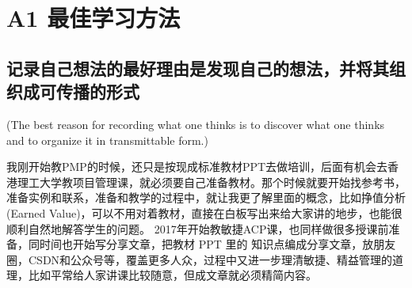 \chapter{A1 最佳学习方法} %

\hypertarget{ux8bb0ux5f55ux81eaux5df1ux60f3ux6cd5ux7684ux6700ux597dux7406ux7531ux662fux53d1ux73b0ux81eaux5df1ux7684ux60f3ux6cd5ux5e76ux5c06ux5176ux7ec4ux7ec7ux6210ux53efux4f20ux64adux7684ux5f62ux5f0f}{%
\section{记录自己想法的最好理由是发现自己的想法，并将其组织成可传播的形式}\label{ux8bb0ux5f55ux81eaux5df1ux60f3ux6cd5ux7684ux6700ux597dux7406ux7531ux662fux53d1ux73b0ux81eaux5df1ux7684ux60f3ux6cd5ux5e76ux5c06ux5176ux7ec4ux7ec7ux6210ux53efux4f20ux64adux7684ux5f62ux5f0f}}

(The best reason for recording what one thinks is to discover what one
thinks and to organize it in transmittable form.)



\newpage

我刚开始教PMP的时候，还只是按现成标准教材PPT去做培训，后面有机会去香港理工大学教项目管理课，就必须要自己准备教材。那个时候就要开始找参考书，准备实例和联系，准备和教学的过程中，就让我更了解里面的概念，比如挣值分析(Earned
Value)，可以不用对着教材，直接在白板写出来给大家讲的地步，也能很顺利自然地解答学生的问题。
2017年开始教敏捷ACP课，也同样做很多授课前准备，同时间也开始写分享文章，把教材
PPT 里的
知识点编成分享文章，放朋友圈，CSDN和公众号等，覆盖更多人众，过程中又进一步理清敏捷、精益管理的道理，比如平常给人家讲课比较随意，但成文章就必须精简内容。

